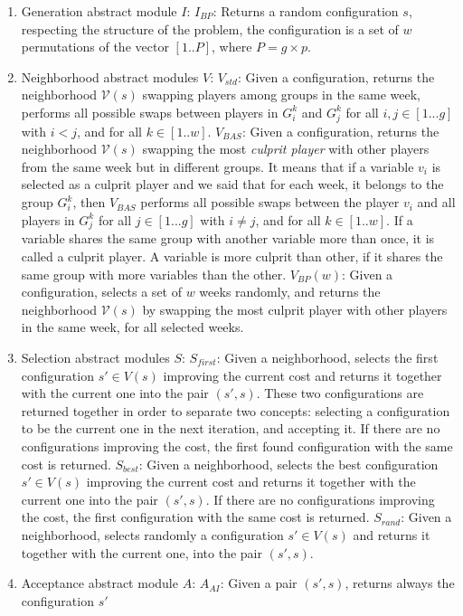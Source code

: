 \begin{enumerate}
\item Generation abstract module $I$:
\subitem $I_{BP}$: Returns a random configuration $s$, respecting the structure of the problem, \ie the configuration is a set of $w$ permutations of the vector $[1..P]$, where $P=g\times p$.
\item Neighborhood abstract modules $V$:
\subitem $V_{std}$: Given a configuration, returns the neighborhood $\mathcal{V}\left(s\right)$ swapping players among groups in the same week, \ie performs all possible swaps between players in $G_i^k$ and $G_j^k$ for all $i, j \in [1...g]$ with $i < j$, and for all $k\in [1..w]$.
\subitem $V_{BAS}$: Given a configuration, returns the neighborhood $\mathcal{V}\left(s\right)$ swapping the most \textit{culprit player} with other players from the same week but in different groups. It means that if a variable $v_i$ is selected as a culprit player and we said that for each week, it belongs to the group $G_{i}^k$, then $V_{BAS}$ performs all possible swaps between the player $v_i$ and all players in $G_j^k$ for all $j \in [1...g]$ with $i \neq j$, and for all $k\in [1..w]$. If a variable shares the same group with another variable more than once, it is called a culprit player. A variable is more culprit than other, if it shares the same group with more variables than the other. %
\subitem $V_{BP}(w)$: Given a configuration, selects a set of $w$ weeks randomly, and returns the neighborhood $\mathcal{V}\left(s\right)$ by swapping the most culprit player with other players in the same week, for all selected weeks. %
\item Selection abstract modules $S$:
\subitem $S_{first}$: Given a neighborhood, selects the first configuration $s' \in V\left(s\right)$ improving the current cost and returns it together with the current one into the pair $\left(s', s\right)$. These two configurations are returned together in order to separate two concepts: selecting a configuration to be the current one in the next iteration, and accepting it. If there are no configurations improving the cost, the first found configuration with the same cost is returned.
\subitem $S_{best}$: Given a neighborhood, selects the best configuration $s' \in V\left(s\right)$ improving the current cost and returns it together with the current one into the pair $\left(s', s\right)$. If there are no configurations improving the cost, the first configuration with the same cost is returned.
\subitem $S_{rand}$: Given a neighborhood, selects randomly a configuration $s' \in V\left(s\right)$ and returns it together with the current one, into the pair $\left(s', s\right)$.
\item Acceptance abstract module $A$:
\subitem $A_{AI}$: Given a pair $\left(s', s\right)$, returns always the configuration $s'$
\end{enumerate}

